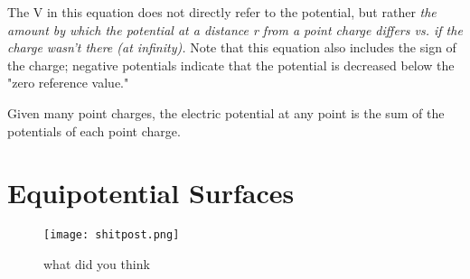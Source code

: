 \documentclass[12pt, a4paper]{article}
\theoremstyle{definition}
\begin{document}
The V in this equation does not directly refer to the potential, but rather \textit{the amount by which the potential at a distance r from a point charge differs vs. if the charge wasn't there (at infinity).}
Note that this equation also includes the sign of the charge; negative potentials indicate that the potential is decreased below the "zero reference value."

Given many point charges, the electric potential at any point is the sum of the potentials of each point charge.

\newpage

\section{Equipotential Surfaces}
\begin{figure}[t]
    \centering
    \texttt{[image: shitpost.png]}
    \caption{what did you think}
    \label{fig:trollface}
\end{figure}
\end{document}
